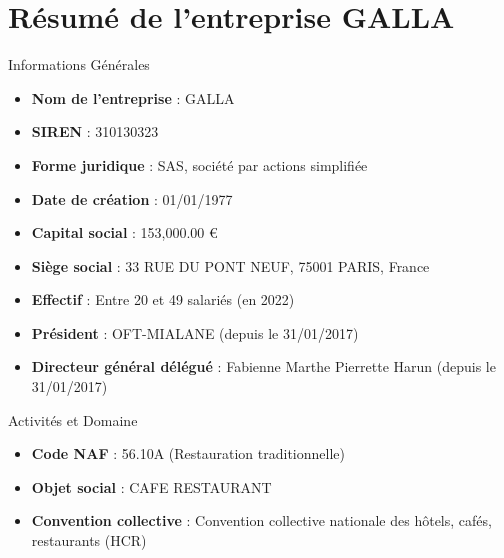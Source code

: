 \section{Résumé de l'entreprise
GALLA}\label{ruxe9sumuxe9-de-lentreprise-galla}

\begin{frame}{Informations Générales}
\label{informations-guxe9nuxe9rales}
\begin{itemize}
\tightlist
\item
  \textbf{Nom de l'entreprise} : GALLA
\item
  \textbf{SIREN} : 310130323
\item
  \textbf{Forme juridique} : SAS, société par actions simplifiée
\item
  \textbf{Date de création} : 01/01/1977
\item
  \textbf{Capital social} : 153,000.00 €
\item
  \textbf{Siège social} : 33 RUE DU PONT NEUF, 75001 PARIS, France
\item
  \textbf{Effectif} : Entre 20 et 49 salariés (en 2022)
\item
  \textbf{Président} : OFT-MIALANE (depuis le 31/01/2017)
\item
  \textbf{Directeur général délégué} : Fabienne Marthe Pierrette Harun
  (depuis le 31/01/2017)
\end{itemize}
\end{frame}

\begin{frame}{Activités et Domaine}
\label{activituxe9s-et-domaine}
\begin{itemize}
\tightlist
\item
  \textbf{Code NAF} : 56.10A (Restauration traditionnelle)
\item
  \textbf{Objet social} : CAFE RESTAURANT
\item
  \textbf{Convention collective} : Convention collective nationale des
  hôtels, cafés, restaurants (HCR)
\end{itemize}
\end{frame}

